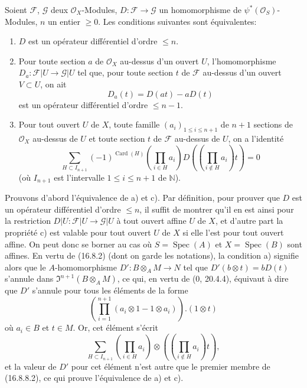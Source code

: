 \begin{proposition}[16.8.8]
\label{IV.16.8.8}
Soient $\mathscr{F}$, $\mathscr{G}$ deux $\mathcal{O}_X$-Modules,
$D:\mathscr{F}\to\mathscr{G}$ un homomorphisme de
$\psi^*(\mathcal{O}_S)$-Modules, $n$ un entier $\geq0$. Les conditions
suivantes sont équivalentes:
\begin{enumerate}
  \item[(a)] $D$ est un opérateur différentiel d'ordre $\leq n$.
  \item[(b)] Pour toute section $a$ de $\mathcal{O}_X$ au-dessus d'un ouvert
  $U$, l'homomorphisme $D_a:\mathscr{F}|U\to\mathscr{G}|U$ tel que, pour
  toute section $t$ de $\mathscr{F}$ au-dessus d'un ouvert $V\subset U$, on
  ait
  \[
    D_a(t)=D(at)-aD(t)
    \tag{16.8.8.1}
    \label{IV.16.8.8.1}
  \]
  est un opérateur différentiel d'ordre $\leq n-1$.
  \item[(c)] Pour tout ouvert $U$ de $X$, toute famille
  $(a_i)_{1\leq i\leq n+1}$ de $n+1$ sections de $\mathcal{O}_X$ au-dessus
  de $U$ et toute section $t$ de $\mathscr{F}$ au-dessus de $U$, on a
  l'identité
  \[
    \sum_{H\subset I_{n+1}}(-1)^{\operatorname{Card}(H)}
    \left(\prod_{i\in H}a_i\right)
    D\!\left(\left(\prod_{i\notin H}a_i\right)t\right)=0
    \tag{16.8.8.2}
    \label{IV.16.8.8.2}
  \]
  (où $I_{n+1}$ est l'intervalle $1\leq i\leq n+1$ de $\mathbb{N}$).
\end{enumerate}
\end{proposition}

Prouvons d'abord l'équivalence de a) et c). Par définition, pour prouver que
$D$ est un opérateur différentiel d'ordre $\leq n$, il suffit de montrer qu'il
en est ainsi pour la restriction
$D|U:\mathscr{F}|U\to\mathscr{G}|U$ à tout ouvert affine $U$ de $X$, et
d'autre part la propriété c) est valable pour tout ouvert $U$ de $X$ si elle
l'est pour tout ouvert affine. On peut donc se borner au cas où
$S=\operatorname{Spec}(A)$ et $X=\operatorname{Spec}(B)$ sont affines. En
vertu de (16.8.2) (dont on garde les notations), la condition a) signifie
alors que le $A$-homomorphisme $D':B\otimes_A M\to N$ tel que
$D'(b\otimes t)=bD(t)$ s'annule dans
$\mathfrak{I}^{n+1}(B\otimes_A M)$, ce qui, en vertu de (0, 20.4.4), équivaut
à dire que $D'$ s'annule pour tous les éléments de la forme
\[
  \left(\prod_{i=1}^{n+1}(a_i\otimes1-1\otimes a_i)\right).(1\otimes t)
\]
où $a_i\in B$ et $t\in M$. Or, cet élément s'écrit
\[
  \sum_{H\subset I_{n+1}}
  \left(\prod_{i\in H}a_i\right)\otimes
  \left(\left(\prod_{i\notin H}a_i\right)t\right),
\]
et la valeur de $D'$ pour cet élément n'est autre que le premier membre de
(16.8.8.2), ce qui prouve l'équivalence de a) et c).

